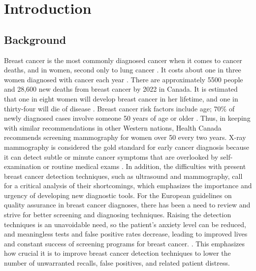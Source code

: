\chapter{Introduction}
\label{chap1}
\section{Background}
Breast cancer is the most commonly diagnosed cancer when it comes to cancer deaths, and in women, second only to lung cancer \cite{CanadianCancer2004}. It costs about one in three women diagnosed with cancer each year \cite{CancerJournal}. There are approximately 5500 people and 28,600 new deaths from breast cancer by 2022 in Canada. It is estimated that one in eight women will develop breast cancer in her lifetime, and one in thirty-four will die of disease \cite{PublicHealthAgencyofCanada2024}.
\newline Breast cancer risk factors include age; 70\% of newly diagnosed cases involve someone 50 years of age or older \cite{CanadianCancer2004}. Thus, in keeping with similar recommendations in other Western nations, Health Canada recommends screening mammography for women over 50 every two years. X-ray mammography is considered the gold standard for early cancer diagnosis because it can detect subtle or minute cancer symptoms that are overlooked by self-examination or routine medical exams \cite{CanadianCancer2004}.
\newline In addition, the difficulties with present breast cancer detection techniques, such as ultrasound and mammography, call for a critical analysis of their shortcomings, which emphasizes the importance and urgency of developing new diagnostic tools. For the European guidelines on quality assurance in breast cancer diagnoses, there has been a need to review and strive for better screening and diagnosing techniques. Raising the detection techniques is an unavoidable need, so the patient's anxiety level can be reduced, and meaningless tests and false positive rates decrease, leading to improved lives and constant success of screening programs for breast cancer. \cite{QualityMeasure}. This emphasizes how crucial it is to improve breast cancer detection techniques to lower the number of unwarranted recalls, false positives, and related patient distress.
